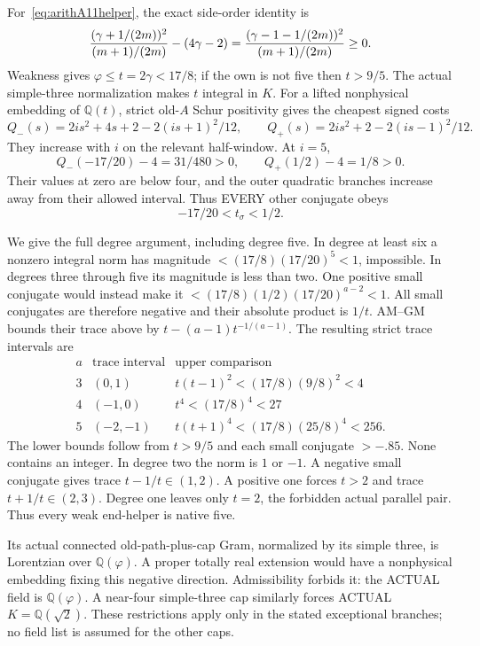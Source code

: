 For~\eqref{eq:arithA11helper}, the exact
side-order identity is
\[
 {(\gamma+1/(2m))^2\over(m+1)/(2m)}
                 -(4\gamma-2)
 ={(\gamma-1-1/(2m))^2\over(m+1)/(2m)}\ge0 .
\]
Weakness gives \(\varphi\le t=2\gamma<17/8\);
if the own is not five then \(t>9/5\).
The actual simple-three normalization makes
\(t\) integral in \(K\).
For a lifted nonphysical embedding of
\(\mathbb Q(t)\), strict old-\(A\) Schur
positivity gives the cheapest signed costs
\[
 Q_-(s)=2is^2+4s+2-2(is+1)^2/12,\qquad
 Q_+(s)=2is^2+2-2(is-1)^2/12 .
\]
They increase with \(i\) on the relevant
half-window.  At \(i=5\),
\[
 Q_-(-17/20)-4=31/480>0,\qquad
 Q_+(1/2)-4=1/8>0 .
\]
Their values at zero are below four, and
the outer quadratic branches increase away
from their allowed interval.
Thus EVERY other conjugate obeys
\[
                    -17/20<t_\sigma<1/2 .
\tag{A11strip}\label{eq:arithA11strip}
\]

We give the full degree argument, including
degree five.  In degree at least six a
nonzero integral norm has magnitude
\(<(17/8)(17/20)^5<1\), impossible.
In degrees three through five its magnitude
is less than two.
One positive small conjugate would instead
make it \(<(17/8)(1/2)(17/20)^{a-2}<1\).
All small conjugates are therefore negative
and their absolute product is \(1/t\).
AM--GM bounds their trace above by
\(t-(a-1)t^{-1/(a-1)}\).
The resulting strict trace intervals are
\[
 \begin{array}{c|c|c}
 a&\text{trace interval}&\text{upper comparison}\\ \hline
 3&(0,1)&t(t-1)^2<(17/8)(9/8)^2<4\\
 4&(-1,0)&t^4<(17/8)^4<27\\
 5&(-2,-1)&t(t+1)^4<(17/8)(25/8)^4<256 .
 \end{array}
\]
The lower bounds follow from
\(t>9/5\) and each small conjugate \(>-.85\).
None contains an integer.
In degree two the norm is \(1\) or \(-1\).
A negative small conjugate gives trace
\(t-1/t\in(1,2)\).
A positive one forces \(t>2\) and trace
\(t+1/t\in(2,3)\).
Degree one leaves only \(t=2\), the
forbidden actual parallel pair.
Thus every weak end-helper is native five.

Its actual connected old-path-plus-cap Gram,
normalized by its simple three, is Lorentzian
over \(\mathbb Q(\varphi)\).
A proper totally real extension would have
a nonphysical embedding fixing this negative
direction.  Admissibility forbids it:
the ACTUAL field is \(\mathbb Q(\varphi)\).
A near-four simple-three cap similarly forces
ACTUAL \(K=\mathbb Q(\sqrt2)\).
These restrictions apply only in the stated
exceptional branches; no field list is assumed
for the other caps.

